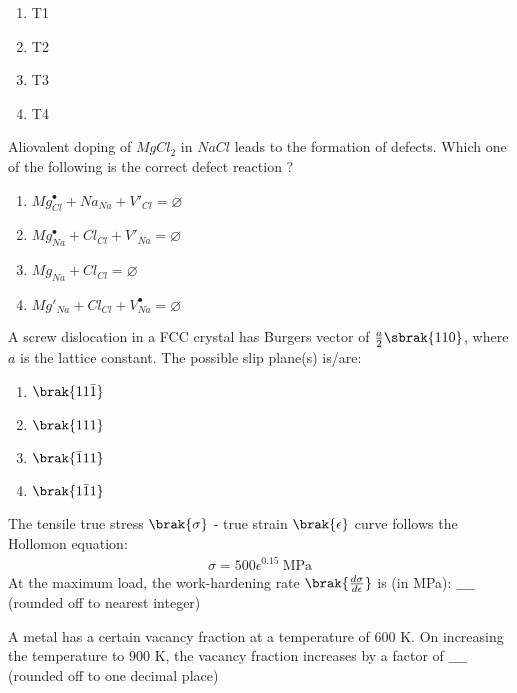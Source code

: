 \begin{figure}[!ht]
\centering
\resizebox{0.9\textwidth}{!}{%

}%
\end{figure}
\begin{enumerate}
    \item T1
    \item T2
    \item T3
    \item T4 \\
\end{enumerate}
\item Aliovalent doping of $MgCl_2$ in $NaCl$ leads to the formation of defects. Which one of the following is the correct defect reaction ?
\begin{enumerate}
    \item $Mg^{\bullet}_{Cl} + Na_{Na} + V'_{Cl} = \varnothing$
    \item $Mg^{\bullet}_{Na} + Cl_{Cl} + V'_{Na} = \varnothing$
    \item $Mg_{Na} + Cl_{Cl} = \varnothing$
    \item $Mg'_{Na} + Cl_{Cl} + V^{\bullet}_{Na} = \varnothing$ \\
\end{enumerate}
\item A screw dislocation in a FCC crystal has Burgers vector of $\frac{a}{2}\sbrak{1 1 0}$, where $a$ is the lattice constant. The possible slip plane(s) is/are:
\begin{enumerate}
    \item $\brak{1 1 \bar{1}}$
    \item $\brak{1 1 1}$
    \item $\brak{\bar{1} 1 1}$
    \item $\brak{1 \bar{1} 1}$ \\
\end{enumerate}
\item The tensile true stress $\brak{\sigma}$ - true strain $\brak{\epsilon}$ curve follows the Hollomon equation:
\begin{align*}
    \sigma = 500\epsilon^{0.15}\ \text{MPa}
\end{align*}
At the maximum load, the work-hardening rate $\brak{\frac{d\sigma}{d\epsilon}}$ is (in MPa): $\_\_\_\_$ (rounded off to nearest integer) \\
\item A metal has a certain vacancy fraction at a temperature of 600 K. On increasing the temperature to 900 K, the vacancy fraction increases by a factor of $\_\_\_\_$ (rounded off to one decimal place) \\\\
